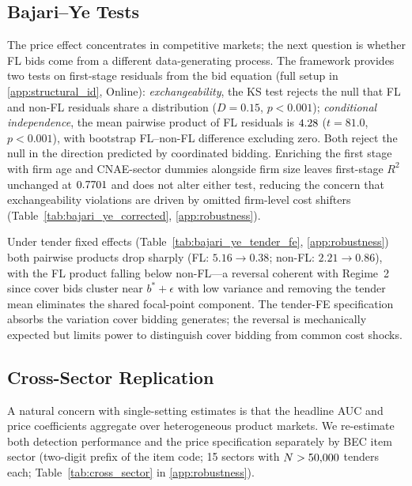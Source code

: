 

\subsection{Bajari--Ye Tests}
\label{sec:results_bajari}

The price effect concentrates in competitive markets; the next
question is whether FL bids come from a different data-generating
process. The \citet{bajari2003deciding} framework provides two
tests on first-stage residuals from the bid equation (full setup
in \ref{app:structural_id}, Online):
\emph{exchangeability}, the KS test rejects the null that FL and
non-FL residuals share a distribution ($D = 0.15$, $p < 0.001$);
\emph{conditional independence}, the mean pairwise product of FL
residuals is $4.28$ ($t = 81.0$, $p < 0.001$), with bootstrap
FL--non-FL difference excluding zero. Both reject the null in the
direction predicted by coordinated bidding. Enriching the
first stage with firm age and CNAE-sector dummies alongside firm
size leaves first-stage $R^2$ unchanged at $0.7701$ and does not
alter either test, reducing the concern that exchangeability
violations are driven by omitted firm-level cost shifters
(Table~\ref{tab:bajari_ye_corrected}, \ref{app:robustness}).

Under tender fixed effects (Table~\ref{tab:bajari_ye_tender_fe},
\ref{app:robustness}) both pairwise products drop sharply
(FL: $5.16 \to 0.38$; non-FL: $2.21 \to 0.86$), with the FL
product falling below non-FL---a reversal coherent with
Regime~2 since cover bids cluster near $b^* + \epsilon$ with
low variance and removing the tender mean eliminates the shared
focal-point component. The tender-FE specification absorbs the
variation cover bidding generates; the reversal is mechanically
expected but limits power to distinguish cover bidding from
common cost shocks.

\subsection{Cross-Sector Replication}
\label{sec:cross_sector}

A natural concern with single-setting estimates is that the
headline AUC and price coefficients aggregate over heterogeneous
product markets. We re-estimate both detection performance and
the price specification separately by BEC item sector
(two-digit prefix of the item code; 15 sectors with $N > 50{,}000$
tenders each; Table~\ref{tab:cross_sector} in
\ref{app:robustness}).

